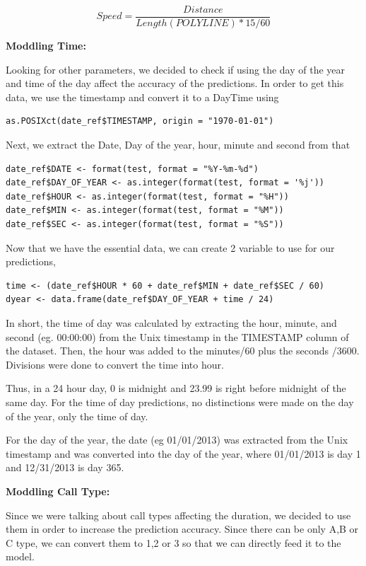 \documentclass[11pt]{article}
\begin{document}
\begin{equation*}
	Speed = \frac{Distance} {Length(POLYLINE) * 15 / 60}
\end{equation*}

\textbf{Moddling Time:}
\par
Looking for other parameters, we decided to check if using the day of the year and time of the day affect the accuracy of the predictions. In order to get this data, we use the timestamp and convert it to a DayTime using

\begin{lstlisting}
as.POSIXct(date_ref$TIMESTAMP, origin = "1970-01-01")
\end{lstlisting}
\par
Next, we extract the Date, Day of the year, hour, minute and second from that
\begin{lstlisting}
date_ref$DATE <- format(test, format = "%Y-%m-%d")
date_ref$DAY_OF_YEAR <- as.integer(format(test, format = '%j'))
date_ref$HOUR <- as.integer(format(test, format = "%H"))
date_ref$MIN <- as.integer(format(test, format = "%M"))
date_ref$SEC <- as.integer(format(test, format = "%S"))
\end{lstlisting}

\par
Now that we have the essential data, we can create 2 variable to use for our predictions, 
\begin{lstlisting}
time <- (date_ref$HOUR * 60 + date_ref$MIN + date_ref$SEC / 60)
dyear <- data.frame(date_ref$DAY_OF_YEAR + time / 24)  
\end{lstlisting}

\par
In short, the time of day was calculated by extracting the hour, minute, and second (eg. 00:00:00) from the Unix timestamp in the TIMESTAMP column of the dataset. Then, the hour was added to the minutes/60 plus the seconds /3600. Divisions were done to convert the time into hour.

\par
Thus, in a 24 hour day, 0 is midnight and 23.99 is right before midnight of the same day. For the time of day predictions, no distinctions were made on the day of the year, only the time of day. 
\par
For the day of the year, the date (eg 01/01/2013) was extracted from the Unix timestamp and was converted into the day of the year, where 01/01/2013 is day 1 and 12/31/2013 is day 365. 

\textbf{Moddling Call Type:}
\par
Since we were talking about call types affecting the duration, we decided to use them in order to increase the prediction accuracy. Since there can be only A,B or C type, we can convert them to 1,2 or 3 so that we can directly feed it to the model.
\end{document}
